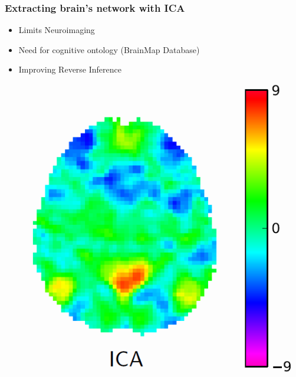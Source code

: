\documentclass{beamer}
\begin{document}
\begin{frame}
\frametitle{Extracting brain's network with ICA}
\begin{minipage}{.50\linewidth}
\begin{itemize}
\item Limits Neuroimaging
\item Need for cognitive ontology (BrainMap Database)
\item Improving Reverse Inference
\end{itemize}
\end{minipage}
\hfill
\begin{minipage}{.45\linewidth}
\centering
\includegraphics[scale=0.4]{ICA.png}
\end{minipage}

\end{frame}
\end{document}

